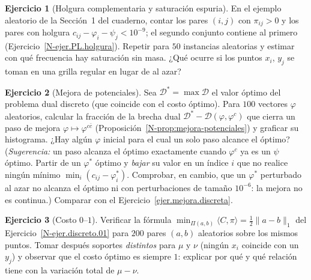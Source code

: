 \documentclass[11pt,a4paper]{amsart}
\newcounter{chapter}
\theoremstyle{remark}
\theoremstyle{definition}
\newtheorem{ejercicio}{Ejercicio}[chapter]
\numberwithin{subsection}{section}
\numberwithin{equation}{section}
\begin{document}
\begin{ejercicio}[Holgura complementaria y saturación espuria]\label{ejc.dual.holgura}
En el ejemplo aleatorio de la Sección~1 del cuaderno, contar los pares $(i,j)$
con $\pi_{ij}>0$ y los pares con holgura $c_{ij}-\varphi_i-\psi_j<10^{-9}$; el
segundo conjunto contiene al primero (Ejercicio~\ref{N-ejer.PL.holgura}).
Repetir para $50$ instancias aleatorias y estimar con qué frecuencia hay
saturación sin masa. ¿Qué ocurre si los puntos $x_i$, $y_j$ se toman en una
grilla regular en lugar de al azar?
\end{ejercicio}

\begin{ejercicio}[Mejora de potenciales]\label{ejc.dual.mejora}
Sea $\mathcal D^*=\max\mathcal D$ el valor óptimo del problema dual discreto
(que coincide con el costo óptimo). Para $100$ vectores $\varphi$ aleatorios,
calcular la fracción de la brecha
dual $\mathcal D^*-\mathcal D(\varphi,\varphi^c)$ que cierra un paso de mejora
$\varphi\mapsto\varphi^{c\bar c}$ (Proposición~\ref{N-prop:mejora-potenciales})
y graficar su histograma. ¿Hay algún $\varphi$ inicial para el cual un solo
paso alcance el óptimo? (\emph{Sugerencia:} un paso alcanza el óptimo
exactamente cuando $\varphi^c$ ya es un $\psi$ óptimo. Partir de un
$\varphi^*$ óptimo y \emph{bajar} su valor en un índice $i$ que no realice
ningún mínimo $\min_i(c_{ij}-\varphi^*_i)$. Comprobar, en cambio, que un
$\varphi^*$ perturbado al azar no alcanza el óptimo ni con perturbaciones de
tamaño $10^{-6}$: la mejora no es continua.) Comparar con el
Ejercicio~\ref{ejer.mejora.discreta}.
\end{ejercicio}

\begin{ejercicio}[Costo $0$--$1$]\label{ejc.dual.01}
Verificar la fórmula $\min_{\Pi(a,b)}\langle C,\pi\rangle=\frac12\|a-b\|_1$
del Ejercicio~\ref{N-ejer.discreto.01} para $200$ pares $(a,b)$ aleatorios
sobre los mismos puntos. Tomar después soportes \emph{distintos} para $\mu$ y
$\nu$ (ningún $x_i$ coincide con un $y_j$) y observar que el costo óptimo es
siempre $1$: explicar por qué y qué relación tiene con la variación total de
$\mu-\nu$.
\end{ejercicio}
\end{document}
